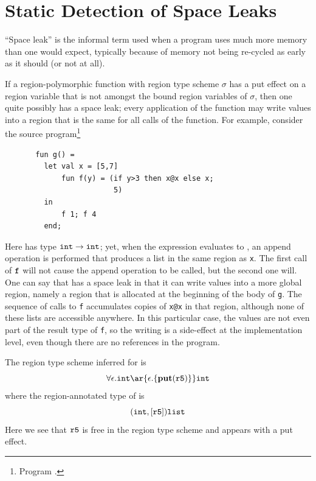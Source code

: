 \documentclass[12pt]{book}
\begin{document}
\chapter{Static Detection of Space Leaks}

\label{spaceleak.sec}
``Space leak'' is the informal term used when a program uses much
more memory than one would expect, typically because of memory not
being re-cycled as early as it should (or not at all).

If a region-polymorphic function with region type scheme $\sigma$
has a put effect on a region variable 
that is not amongst the bound region variables of $\sigma$, then
one quite possibly has a space leak; every application of the
function may write values into a region that is the same for
all calls of the function. For example, consider the 
source program\footnote{Program .}
\begin{verbatim}
       fun g() = 
         let val x = [5,7]
             fun f(y) = (if y>3 then x@x else x; 
                         5)
         in 
             f 1; f 4
         end;
\end{verbatim} 
Here  has type $\hbox{\tt int}\to\hbox{\tt int}$; yet, when the expression  evaluates
to , an append operation is performed that produces a list in the same region
as {\tt x}. The first call of $\hbox{\tt f}$ will not cause the
append operation to be called, but the second one will. One can say that
 has a space leak in that it can write values into a more
global region, namely a region that is allocated at the beginning of
the body of {\tt g}. The sequence of calls to {\tt f}
accumulates copies of {\tt x@x} in that region, although none of these
lists are accessible anywhere.
In this particular case, the values are not even part of 
the result type of {\tt f}, 
so the writing is a side-effect at the implementation level,
even though there are no references in the program.

The region type scheme inferred for  is
$$\forall\epsilon.\boxml{int} \ar{\epsilon.\{\Put(\mathtt{r5})\}} \boxml{int}$$
where the region-annotated type of  is
$$(\hbox{\tt int},[\hbox{\tt r5}])\hbox{\tt list}$$
Here we see that $\hbox{\tt r5}$ is free in the region type scheme and appears with a put effect.
\end{document}
